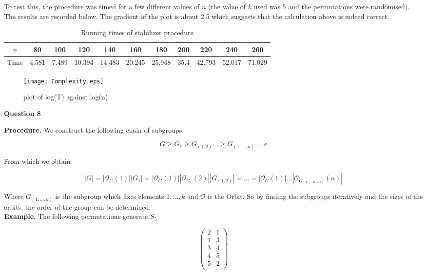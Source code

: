 \documentclass[12pt]{extarticle}
\begin{document}
To test this, the procedure was timed for a few different values of $n$ (the value of $k$ used was 5 and the permutations were randomised). The results are recorded below. The gradient of the plot is about 2.5 which suggests that the calculation above is indeed correct. 

\begin{table}[!htbp]
\centering
\begin{tabular}{|c|cccccccccc|}
\hline
\multirow{1}{2.5em}{$n$} & 80 &100 &120 &140 &160 &180 &200 &220 &240 &260 \\
\hline
\multirow{1}{2.5em}{Time} & 4.581 &7.489 &10.394 &14.483 &20.245 &25.948 &35.4 &42.793 &52.017 &71.029\\
\hline
\end{tabular}
\caption{Running times of stabilizer procedure}
\label{Table:1}
\end{table}

\begin{figure}[!htbp]
\centering
\texttt{[image: Complexity.eps]}\\
\caption{plot of log(T) against log(n)}
\label{figure:1}
\end{figure}
\pagebreak
\begin{center}
\textbf{Question 8}
\end{center}

\textbf{Procedure.} We construct the following chain of subgroups:

$$G\geq G_1 \geq G_{(1,2)} \dots \geq G_{(1,\dots,n)} = e$$

From which we obtain

$$|G| = |\mathcal{O}_G(1)||G_1| = |\mathcal{O}_G(1)||\mathcal{O}_{G_1}(2)||G_{(1,2)}| = \dots = |\mathcal{O}_G(1)|\dots|\mathcal{O}_{G_{(1,\dots,n-1)}}(n)|$$

Where $G_{(1,\dots,k)}$ is the subgroup which fixes elements $1,\dots,k$ and $\mathcal{O}$ is the Orbit. So by finding the subgroups iteratively and the sizes of the orbits, the order of the group can be determined.\\

\textbf{Example.} The following permutations generate $S_5$

$$\begin{pmatrix} 
  2 &  1 \\ 
  1 &  3 \\ 
  3 &  4 \\ 
  4 &  5 \\ 
  5 &  2 \\ 
\end{pmatrix} $$
\end{document}
